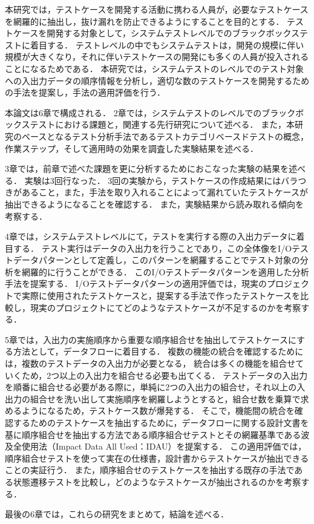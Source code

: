 本研究では，テストケースを開発する活動に携わる人員が，必要なテストケースを網羅的に抽出し，抜け漏れを防止できるようにすることを目的とする．
テストケースを開発する対象として，システムテストレベルでのブラックボックステストに着目する．
テストレベルの中でもシステムテストは，開発の規模に伴い規模が大きくなり，それに伴いテストケースの開発にも多くの人員が投入されることになるためである．
本研究では，システムテストのレベルでのテスト対象への入出力データの順序情報を分析し，適切な数のテストケースを開発するための手法を提案し，手法の適用評価を行う．

本論文は6章で構成される．
2章では，システムテストのレベルでのブラックボックステストにおける課題と，関連する先行研究について述べる．
また，本研究のベースとなるテスト分析手法であるテストカテゴリベースドテストの概念，作業ステップ，そして適用時の効果を調査した実験結果を述べる．

3章では，前章で述べた課題を更に分析するためにおこなった実験の結果を述べる．
実験は3回行なった．
3回の実験から，テストケースの作成結果にはバラつきがあること，また，手法を取り入れることによって漏れていたテストケースが抽出できるようになることを確認する．
また，実験結果から読み取れる傾向を考察する．

4章では，システムテストレベルにて，テストを実行する際の入出力データに着目する．
テスト実行はデータの入出力を行うことであり，この全体像をI/Oテストデータパターンとして定義し，このパターンを網羅することでテスト対象の分析を網羅的に行うことができる．
このI/Oテストデータパターンを適用した分析手法を提案する．
I/Oテストデータパターンの適用評価では，現実のプロジェクトで実際に使用されたテストケースと，提案する手法で作ったテストケースを比較し，現実のプロジェクトにてどのようなテストケースが不足するのかを考察する．

5章では，入出力の実施順序から重要な順序組合せを抽出してテストケースにする方法として，データフローに着目する．
複数の機能の統合を確認するためには，複数のテストデータの入出力が必要となる，
統合は多くの機能を組合せていくため，2つ以上の入出力を組合せる必要も出てくる．
テストデータの入出力を順番に組合せる必要がある際に，単純に2つの入出力の組合せ，それ以上の入出力の組合せを洗い出して実施順序を網羅しようとすると，組合せ数を乗算で求めるようになるため，テストケース数が爆発する．
そこで，機能間の統合を確認するためのテストケースを抽出するために，データフローに関する設計文書を基に順序組合せを抽出する方法である順序組合せテストとその網羅基準である波及全使用法（Impact Data All Used：IDAU）を提案する．
この適用評価では，順序組合せテストを使って実在の仕様書，設計書からテストケースが抽出できることの実証行う．
また，順序組合せのテストケースを抽出する既存の手法である状態遷移テストを比較し，どのようなテストケースが抽出されるのかを考察する．

最後の6章では，これらの研究をまとめて，結論を述べる．
